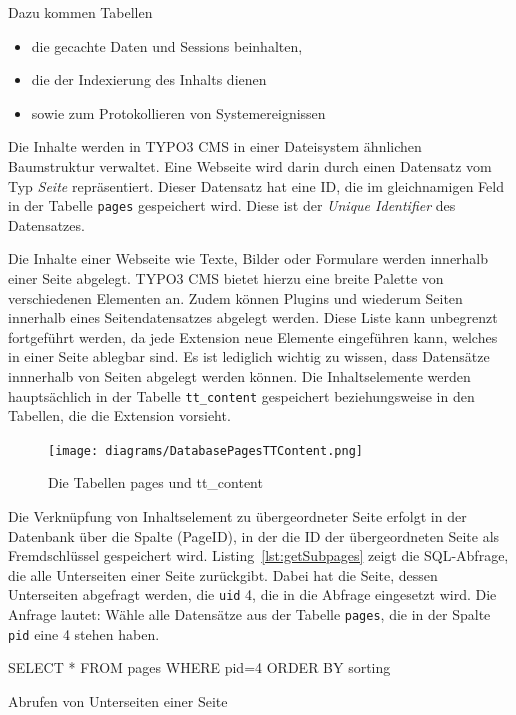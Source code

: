Dazu kommen Tabellen
\begin{itemize}
	\item die gecachte Daten und Sessions beinhalten,
	\item die der Indexierung des Inhalts dienen
	\item sowie zum Protokollieren von Systemereignissen
\end{itemize}

Die Inhalte werden in TYPO3 CMS in einer Dateisystem ähnlichen Baumstruktur verwaltet. Eine Webseite wird darin durch einen Datensatz vom Typ \textit{Seite} repräsentiert. Dieser Datensatz hat eine ID, die im gleichnamigen Feld in der Tabelle \texttt{pages} gespeichert wird. Diese ist der \textit{Unique Identifier} des Datensatzes.

Die Inhalte einer Webseite wie Texte, Bilder oder Formulare werden innerhalb einer Seite abgelegt. TYPO3 CMS bietet hierzu eine breite Palette von verschiedenen Elementen an. Zudem können Plugins und wiederum Seiten innerhalb eines Seitendatensatzes abgelegt werden. Diese Liste kann unbegrenzt fortgeführt werden, da jede Extension neue Elemente eingeführen kann, welches in einer Seite ablegbar sind. Es ist lediglich wichtig zu wissen, dass Datensätze innnerhalb von Seiten abgelegt werden können. Die Inhaltselemente werden hauptsächlich in der Tabelle \texttt{tt\_content} gespeichert beziehungsweise in den Tabellen, die die Extension vorsieht.

\begin{figure}[H]
	\centering
	\texttt{[image: diagrams/DatabasePagesTTContent.png]}
	\caption{Die Tabellen pages und tt\_content}
	\label{fig:pagesAndTTContent}
\end{figure}

Die Verknüpfung von Inhaltselement zu übergeordneter Seite erfolgt in der Datenbank über die Spalte  (PageID), in der die ID der übergeordneten Seite als Fremdschlüssel gespeichert wird. Listing~\ref{lst:getSubpages} zeigt die SQL-Abfrage, die alle Unterseiten einer Seite zurückgibt. Dabei hat die Seite, dessen Unterseiten abgefragt werden, die \texttt{uid} 4, die in die Abfrage eingesetzt wird. Die Anfrage lautet: Wähle alle Datensätze aus der Tabelle \texttt{pages}, die in der Spalte \texttt{pid} eine 4 stehen haben.

\begin{listing}
	\begin{phpcode}
SELECT * FROM pages WHERE pid=4 ORDER BY sorting
	\end{phpcode}
	\caption{Abrufen von Unterseiten einer Seite}
	\label{lst:getSubpages}
\end{listing}

